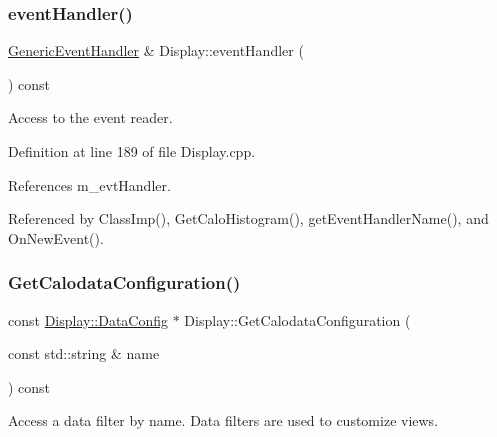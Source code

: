 \hypertarget{class_d_d4hep_1_1_display_acac8dcc69fc7ad0dc872c9a26ccaea76}{}\label{class_d_d4hep_1_1_display_acac8dcc69fc7ad0dc872c9a26ccaea76} 
\subsubsection{\texorpdfstring{event\+Handler()}{eventHandler()}}
{\footnotesize\ttfamily \hyperlink{class_d_d4hep_1_1_generic_event_handler}{Generic\+Event\+Handler} \& Display\+::event\+Handler (\begin{DoxyParamCaption}{ }\end{DoxyParamCaption}) const}



Access to the event reader. 



Definition at line 189 of file Display.\+cpp.



References m\+\_\+evt\+Handler.



Referenced by Class\+Imp(), Get\+Calo\+Histogram(), get\+Event\+Handler\+Name(), and On\+New\+Event().

\hypertarget{class_d_d4hep_1_1_display_adb46b500424decc7f41300e8995de11f}{}\label{class_d_d4hep_1_1_display_adb46b500424decc7f41300e8995de11f} 
\subsubsection{\texorpdfstring{Get\+Calodata\+Configuration()}{GetCalodataConfiguration()}}
{\footnotesize\ttfamily const \hyperlink{class_d_d4hep_1_1_display_a79237f24a5b3ec781faa5f8e20579ae0}{Display\+::\+Data\+Config} $\ast$ Display\+::\+Get\+Calodata\+Configuration (\begin{DoxyParamCaption}\item[{const std\+::string \&}]{name }\end{DoxyParamCaption}) const}



Access a data filter by name. Data filters are used to customize views. 

